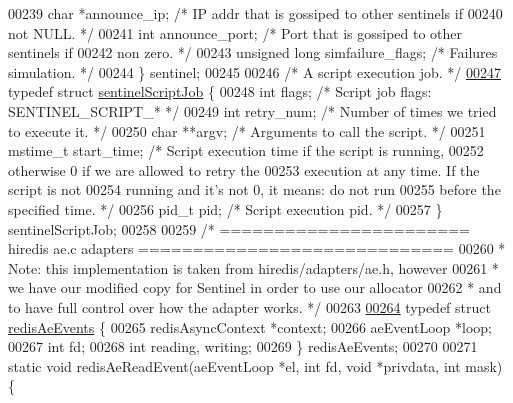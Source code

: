 \begin{DoxyCode}
00239     \textcolor{keywordtype}{char} *announce\_ip;  \textcolor{comment}{/* IP addr that is gossiped to other sentinels if}
00240 \textcolor{comment}{                           not NULL. */}
00241     \textcolor{keywordtype}{int} announce\_port;  \textcolor{comment}{/* Port that is gossiped to other sentinels if}
00242 \textcolor{comment}{                           non zero. */}
00243     \textcolor{keywordtype}{unsigned} \textcolor{keywordtype}{long} simfailure\_flags; \textcolor{comment}{/* Failures simulation. */}
00244 \} sentinel;
00245 
00246 \textcolor{comment}{/* A script execution job. */}
\hyperlink{structsentinelScriptJob}{00247} \textcolor{keyword}{typedef} \textcolor{keyword}{struct} \hyperlink{structsentinelScriptJob}{sentinelScriptJob} \{
00248     \textcolor{keywordtype}{int} flags;              \textcolor{comment}{/* Script job flags: SENTINEL\_SCRIPT\_* */}
00249     \textcolor{keywordtype}{int} retry\_num;          \textcolor{comment}{/* Number of times we tried to execute it. */}
00250     \textcolor{keywordtype}{char} **argv;            \textcolor{comment}{/* Arguments to call the script. */}
00251     mstime\_t start\_time;    \textcolor{comment}{/* Script execution time if the script is running,}
00252 \textcolor{comment}{                               otherwise 0 if we are allowed to retry the}
00253 \textcolor{comment}{                               execution at any time. If the script is not}
00254 \textcolor{comment}{                               running and it's not 0, it means: do not run}
00255 \textcolor{comment}{                               before the specified time. */}
00256     pid\_t pid;              \textcolor{comment}{/* Script execution pid. */}
00257 \} sentinelScriptJob;
00258 
00259 \textcolor{comment}{/* ======================= hiredis ae.c adapters =============================}
00260 \textcolor{comment}{ * Note: this implementation is taken from hiredis/adapters/ae.h, however}
00261 \textcolor{comment}{ * we have our modified copy for Sentinel in order to use our allocator}
00262 \textcolor{comment}{ * and to have full control over how the adapter works. */}
00263 
\hyperlink{structredisAeEvents}{00264} \textcolor{keyword}{typedef} \textcolor{keyword}{struct} \hyperlink{structredisAeEvents}{redisAeEvents} \{
00265     redisAsyncContext *context;
00266     aeEventLoop *loop;
00267     \textcolor{keywordtype}{int} fd;
00268     \textcolor{keywordtype}{int} reading, writing;
00269 \} redisAeEvents;
00270 
00271 \textcolor{keyword}{static} \textcolor{keywordtype}{void} redisAeReadEvent(aeEventLoop *el, \textcolor{keywordtype}{int} fd, \textcolor{keywordtype}{void} *privdata, \textcolor{keywordtype}{int} mask) \{

\end{DoxyCode}
